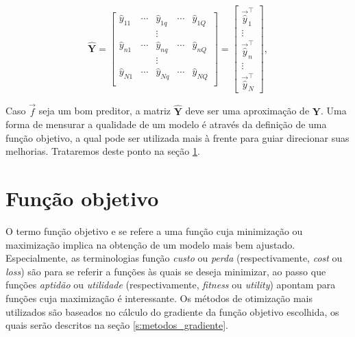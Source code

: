     \begin{equation} \label{e:Y_hat}
      \boldsymbol{\hat{Y}} = \begin{bmatrix}
            \hat{y}_{11} & \cdots & \hat{y}_{1q} & \cdots & \hat{y}_{1Q} \\
                   & & \vdots & &       \\
            \hat{y}_{n1} & \cdots & \hat{y}_{nq} & \cdots & \hat{y}_{nQ} \\
                   & & \vdots & &       \\
            \hat{y}_{N1} & \cdots & \hat{y}_{Nq} & \cdots & \hat{y}_{NQ} \\
          \end{bmatrix}
        = \begin{bmatrix}
            \vec{\hat{y}}_1^{\top} \\
            \vdots \\
            \vec{\hat{y}}_n^{\top} \\
            \vdots \\
            \vec{\hat{y}}_N^{\top}
          \end{bmatrix}
          ,
    \end{equation}

    Caso $\vec{f}$ seja um bom preditor, a matriz $\boldsymbol{\hat{Y}}$ deve ser uma aproximação de $\boldsymbol{Y}$. Uma forma de mensurar a qualidade de um modelo é através da definição de uma função objetivo, a qual pode ser utilizada mais à frente para guiar direcionar suas melhorias. Trataremos deste ponto na seção \ref{s:objetivo}.

  \section{Função objetivo} \label{s:objetivo}

    O termo função objetivo e se refere a uma função cuja minimização ou maximização implica na obtenção de um modelo mais bem ajustado. Especialmente, as terminologias função \emph{custo} ou \emph{perda} (respectivamente, \textit{cost} ou \textit{loss}) são \DIFdelbegin {}\DIFdelend \DIFaddbegin {}\DIFaddend para se referir a funções às quais se deseja minimizar, ao passo que funções \emph{aptidão} ou \emph{utilidade} (respectivamente, \textit{fitness} ou \textit{utility}) apontam para funções cuja maximização é interessante. Os métodos de otimização mais utilizados são baseados no cálculo do gradiente da função objetivo escolhida, os quais serão descritos na seção \ref{s:metodos_gradiente}. %

